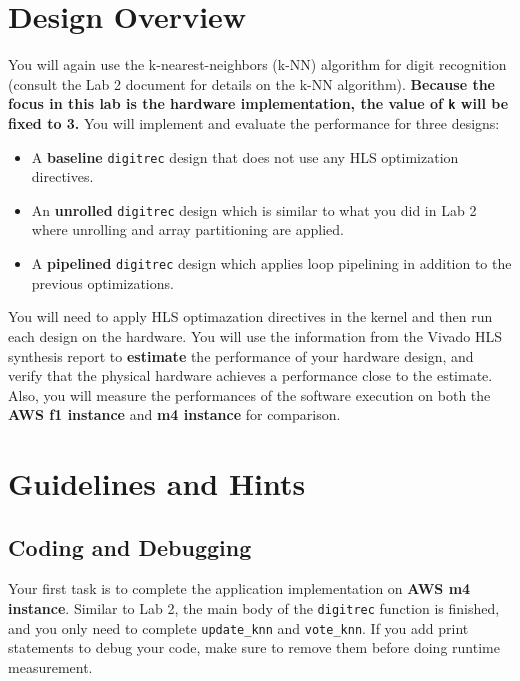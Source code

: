 \documentclass[paper=letter, fontsize=10pt]{scrartcl} %
\numberwithin{equation}{section} %
\numberwithin{figure}{section} %
\numberwithin{table}{section} %
\begin{document}

\section{Design Overview}
You will again use the k-nearest-neighbors (k-NN) algorithm for digit recognition
(consult the Lab 2 document for details on the k-NN algorithm).
\textbf{Because the focus in this lab is the hardware implementation, the value of \texttt{k} will be fixed to 3.}
You will implement and evaluate the performance for three designs:
\begin{itemize}
  \item A \textbf{baseline} \texttt{digitrec} design that does not use any HLS optimization directives. 
  \item An \textbf{unrolled} \texttt{digitrec} design which is similar to what you did in Lab 2 where unrolling and array partitioning are applied.
  \item A \textbf{pipelined} \texttt{digitrec} design which applies loop pipelining in addition to the previous optimizations.
\end{itemize}
You will need to apply HLS optimazation directives in the kernel and then run each design on the hardware.
You will use the information from the Vivado HLS synthesis report to \textbf{estimate} the performance of your hardware design, and verify that the
physical hardware achieves a performance close to the estimate.
Also, you will measure the performances of the software execution 
on both the \textbf{AWS f1 instance} and \textbf{m4 instance} for comparison.

\section{Guidelines and Hints}
\subsection{Coding and Debugging}
Your first task is to complete the application implementation
on \textbf{AWS m4 instance}. Similar to Lab 2, the main body of the \texttt{digitrec} function is finished,
and you only need to complete \texttt{update\_knn} and \texttt{vote\_knn}.  
If you add print statements to debug your code, make sure to remove them before
doing runtime measurement.
\end{document}
